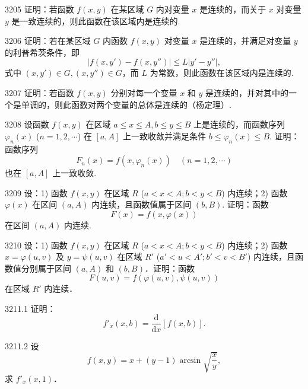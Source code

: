 \begin{prob}[M]{3205}
证明：若函数 $f(x, y)$ 在某区域 $G$ 内对变量 $x$ 是连续的，而关于 $x$ 对变量 $y$ 是一致连续的，则此函数在该区域内是连续的.
\end{prob}

\begin{prob}[M]{3206}
证明：若在某区域 $G$ 内函数 $f(x, y)$ 对变量 $x$ 是连续的，并满足对变量 $y$ 的利普希茨条件，即
\[
|f(x, y') - f(x, y'')| \leqslant L|y' - y''|,
\]
式中 $(x, y') \in G, (x, y'') \in G$，而 $L$ 为常数，则此函数在该区域内是连续的.
\end{prob}

\begin{prob}[M]{3207}
证明：若函数 $f(x, y)$ 分别对每一个变量 $x$ 和 $y$ 是连续的，并对其中的一个是单调的，则此函数对两个变量的总体是连续的（杨定理）.
\end{prob}

\begin{prob}[M]{3208}
设函数 $f(x, y)$ 在区域 $a \leqslant x \leqslant A, b \leqslant y \leqslant B$ 上是连续的，而函数序列 $\varphi_n(x)$ ($n = 1, 2, \cdots$) 在 $[a, A]$ 上一致收敛并满足条件 $b \leqslant \varphi_n(x) \leqslant B$. 证明：函数序列
\[
F_n(x) = f(x, \varphi_n(x)) \quad (n = 1, 2, \cdots)
\]
也在 $[a, A]$ 上一致收敛.
\end{prob}

\begin{prob}[M]{3209}
设：1) 函数 $f(x, y)$ 在区域 $R$ ($a < x < A; b < y < B$) 内连续；2) 函数 $\varphi(x)$ 在区间 $(a, A)$ 内连续，且函数值属于区间 $(b, B)$. 证明：函数
\[
F(x) = f(x, \varphi(x))
\]
在区间 $(a, A)$ 内连续.
\end{prob}

\begin{prob}[M]{3210}
设：1) 函数 $f(x,y)$ 在区域 $R$ ($a < x < A; b < y < B$) 内连续；2) 函数 $x = \varphi(u,v)$ 及 $y = \psi(u,v)$ 在区域 $R'$ ($a' < u < A'; b' < v < B'$) 内连续，且函数值分别属于区间 $(a, A)$ 和 $(b, B)$．证明：函数
\[
F(u,v) = f(\varphi(u,v), \psi(u,v))
\]
在区域 $R'$ 内连续．
\end{prob}


\begin{prob}[S]{3211.1}
证明：
\[
f'_x(x,b) = \frac{\mathrm{d}}{\mathrm{d}x}[f(x,b)].
\]
\end{prob}

\begin{prob}[M]{3211.2}
设
\[
f(x,y) = x + (y-1)\arcsin\sqrt{\frac{x}{y}},
\]
求 $f'_x(x,1)$．
\end{prob}

